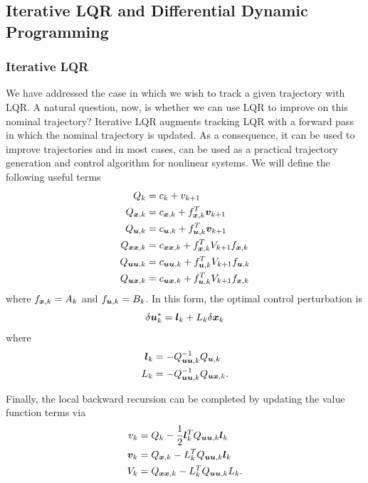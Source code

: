 \subsection{Iterative LQR and Differential Dynamic Programming}

\subsubsection{Iterative LQR}

We have addressed the case in which we wish to track a given trajectory with LQR. A natural question, now, is whether we can use LQR to improve on this nominal trajectory? Iterative LQR augments tracking LQR with a forward pass in which the nominal trajectory is updated. As a consequence, it can be used to improve trajectories and in most cases, can be used as a practical trajectory generation and control algorithm for nonlinear systems. We will define the following useful terms
\begin{align}
\label{eq:Qk}
    Q_k &= c_k + v_{k+1}\\
    Q_{\bm{x},k} &= c_{\bm{x},k} + f_{\bm{x},k}^T \bm{v}_{k+1}\\
    Q_{\bm{u},k} &= c_{\bm{u},k} + f_{\bm{u},k}^T \bm{v}_{k+1}\\
    Q_{\bm{x} \bm{x},k} &= c_{\bm{x} \bm{x},k} + f_{\bm{x},k}^T V_{k+1} f_{\bm{x},k} \label{eq:Qxxk}\\
    Q_{\bm{u} \bm{u},k} &= c_{\bm{u} \bm{u},k} + f_{\bm{u},k}^T V_{k+1} f_{\bm{u},k}\\
    Q_{\bm{u} \bm{x},k} &= c_{\bm{u} \bm{x},k} + f_{\bm{u},k}^T V_{k+1} f_{\bm{x},k} \label{eq:Quxk}
\end{align}
where $f_{\bm{x},k} = A_k$ and $f_{\bm{u},k} = B_k$. In this form, the optimal control perturbation is
\begin{equation}
    \delta \bm{u}_k^* = \bm{l}_k + L_k \delta \bm{x}_k
\end{equation}
where 
\begin{align}
    \label{eq:iLQR_fb1}
    \bm{l}_k &= - Q_{\bm{u} \bm{u},k}^{-1} Q_{\bm{u},k}\\
    L_k &= - Q_{\bm{u} \bm{u},k}^{-1} Q_{\bm{u} \bm{x},k}. \label{eq:iLQR_fb2}
\end{align}

Finally, the local backward recursion can be completed by updating the value function terms via
\begin{align}
    \label{eq:iLQR_V1}
    v_k &= Q_k - \frac{1}{2} \bm{l}_k^T Q_{\bm{u} \bm{u}, k} \bm{l}_k\\
    \bm{v}_{k} &= Q_{\bm{x},k} - L_k^T Q_{\bm{u} \bm{u}, k} \bm{l}_k\\
    V_{k} &= Q_{\bm{x} \bm{x},k} - L_k^T Q_{\bm{u} \bm{u}, k} L_k. \label{eq:iLQR_V3}
\end{align}

